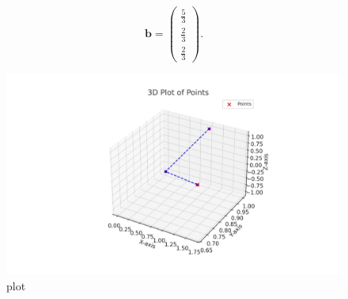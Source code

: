 \documentclass[journal]{IEEEtran}
\begin{document}
\[
\boxed{
\mathbf{b} = \begin{pmatrix} \frac{5}{3} \\[6pt] \frac{2}{3} \\[6pt] \frac{2}{3} \end{pmatrix}.
}
\]





\begin{figure}[htbp]
\centering
\includegraphics[width=\columnwidth]{figs/python_plot.png} 
\caption{plot}
\label{fig:1}
\end{figure}
\end{document}
